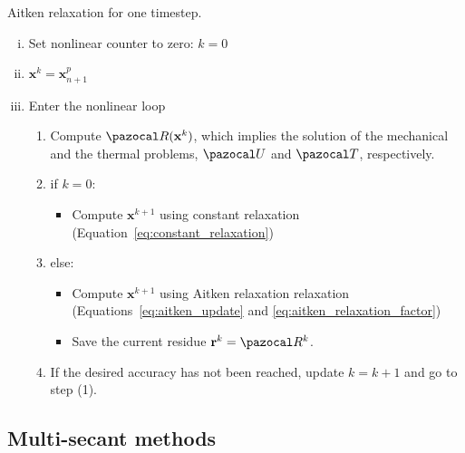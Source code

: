\begin{framedbox}[htb]
  \caption{Aitken relaxation for one timestep.}
  \label{box:aitken_relaxation}
  \begin{center}
    \begin{minipage}{0.9\textwidth}
    \begin{enumerate}[(i)]
    \item Set nonlinear counter to zero: \(k=0\)
    \item \(\mathbf x^k = \mathbf x_{n+1}^p\)
    \item Enter the nonlinear loop
    \begin{enumerate}[(1)]
      \item Compute \(\pazocal R(\mathbf x^k)\), which implies the solution of the mechanical and the thermal problems, \(\pazocal U\) and \(\pazocal T\), respectively.
      \item if \(k=0\):
      \begin{itemize}
        \item Compute \(\mathbf x^{k+1}\) using constant relaxation (Equation~\eqref{eq:constant_relaxation})
      \end{itemize}
      \item else:
      \begin{itemize}
        \item Compute \(\mathbf x^{k+1}\) using Aitken relaxation relaxation (Equations~\eqref{eq:aitken_update} and \eqref{eq:aitken_relaxation_factor})
        \item Save the current residue \(\mathbf r^k = \pazocal R^k\).
      \end{itemize}
      \item If the desired accuracy has not been reached, update \(k=k+1\) and go to step (1).
    \end{enumerate}
    \end{enumerate}
    \end{minipage}
  \end{center}
\end{framedbox}

\subsection{Multi-secant methods} \label{sec:multisecant}

